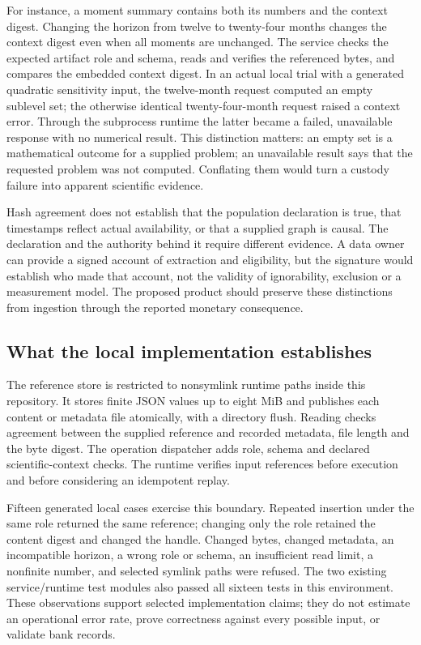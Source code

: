 For instance, a moment summary contains both its numbers and the context
digest. Changing the horizon from twelve to twenty-four months changes
the context digest even when all moments are unchanged. The service
checks the expected artifact role and schema, reads and verifies the
referenced bytes, and compares the embedded context digest. In an actual
local trial with a generated quadratic sensitivity input, the
twelve-month request computed an empty sublevel set; the otherwise
identical twenty-four-month request raised a context error. Through the
subprocess runtime the latter became a failed, unavailable response with
no numerical result. This distinction matters: an empty set is a
mathematical outcome for a supplied problem; an unavailable result says
that the requested problem was not computed. Conflating them would turn
a custody failure into apparent scientific evidence.
\citep{exec14_custody_observations}

Hash agreement does not establish that the population declaration is
true, that timestamps reflect actual availability, or that a supplied
graph is causal. The declaration and the authority behind it require
different evidence. A data owner can provide a signed account of
extraction and eligibility, but the signature would establish who made
that account, not the validity of ignorability, exclusion or a
measurement model. The proposed product should preserve these
distinctions from ingestion through the reported monetary consequence.

\hypertarget{what-the-local-implementation-establishes}{%
\subsection{What the local implementation
establishes}\label{what-the-local-implementation-establishes}}

The reference store is restricted to nonsymlink runtime paths inside
this repository. It stores finite JSON values up to eight MiB and
publishes each content or metadata file atomically, with a directory
flush. Reading checks agreement between the supplied reference and
recorded metadata, file length and the byte digest. The operation
dispatcher adds role, schema and declared scientific-context checks. The
runtime verifies input references before execution and before
considering an idempotent replay. \citep{exec14_custody_implementation}

Fifteen generated local cases exercise this boundary. Repeated insertion
under the same role returned the same reference; changing only the role
retained the content digest and changed the handle. Changed bytes,
changed metadata, an incompatible horizon, a wrong role or schema, an
insufficient read limit, a nonfinite number, and selected symlink paths
were refused. The two existing service/runtime test modules also passed
all sixteen tests in this environment. These observations support
selected implementation claims; they do not estimate an operational
error rate, prove correctness against every possible input, or validate
bank records. \citep{exec14_custody_observations}

